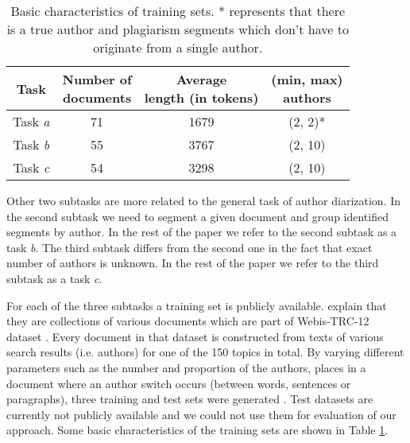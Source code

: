 \documentclass[10pt, a4paper]{article}
\begin{document}
\begin{table}
	\caption{Basic characteristics of training sets. * represents that there is a true author and plagiarism segments which don't have to originate from a single author.}
	\label{tab:dataset-characteristics}
	\begin{center}
		\begin{tabular}{cccc}
			\toprule
			Task & \thead{Number of \\ documents} & \thead{Average \\ length (in tokens)} & \thead{(min, max)\\authors} \\
			\midrule
			Task \emph{a} & 71 & 1679 & (2, 2)*\\
			Task \emph{b} & 55 & 3767 & (2, 10)\\
			Task \emph{c} & 54 & 3298 & (2, 10)\\
			\bottomrule
		\end{tabular}
	\end{center}
\end{table}

Other two subtasks are more related to the general task of author diarization. In the second subtask we need to segment a given document and group identified segments by author. In the rest of the paper we refer to the second subtask as a task \emph{b}. The third subtask differs from the second one in the fact that exact number of authors is unknown. In the rest of the paper we refer to the third subtask as a task \emph{c}.

For each of the three subtasks a training set is publicly available\footnotemark[1]. \citet{rosso-2016} explain that they are collections of various documents which are part of Webis-TRC-12 dataset \citep{potthast-2013}. Every document in that dataset is constructed from texts of various search results (i.e. authors) for one of the 150 topics in total. By varying different parameters such as the number and proportion of the authors, places in a document where an author switch occurs (between words, sentences or paragraphs), three training and test sets were generated \citep{rosso-2016}. Test datasets are currently not publicly available and we could not use them for evaluation of our approach. Some basic characteristics of the training sets are shown in Table \ref{tab:dataset-characteristics}.

\end{document}
